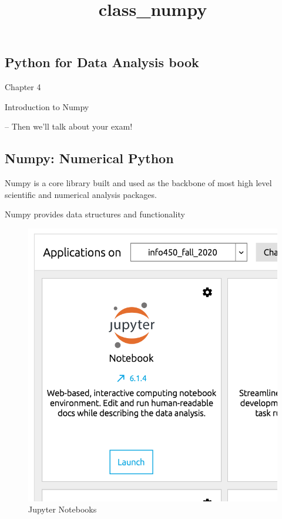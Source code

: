 \documentclass[11pt]{article}
\title{class\_numpy}
\makeatletter
\def\maxwidth{\ifdim\Gin@nat@width>\linewidth\linewidth
    \else\Gin@nat@width\fi}
\let\Oldincludegraphics\includegraphics
\renewcommand{\includegraphics}[1]{\Oldincludegraphics[width=.8\maxwidth]{#1}}
\makeatother
\begin{document}
    
    
    \maketitle
    
    

    
    \hypertarget{python-for-data-analysis-book}{%
\subsection{Python for Data Analysis
book}\label{python-for-data-analysis-book}}

Chapter 4

Introduction to Numpy

-- Then we'll talk about your exam!

    \hypertarget{numpy-numerical-python}{%
\subsection{Numpy: Numerical Python}\label{numpy-numerical-python}}

Numpy is a core library built and used as the backbone of most high
level scientific and numerical analysis packages.

Numpy provides data structures and functionality

    \begin{figure}
\centering
\includegraphics{jupyter_start.png}
\caption{Jupyter Notebooks}
\end{figure}
\end{document}
